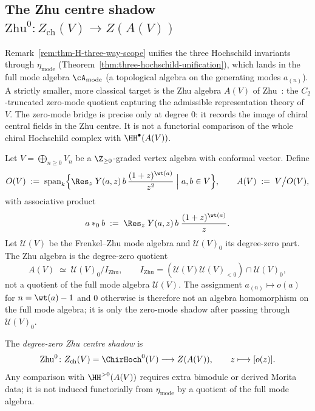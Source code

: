 \subsection{The Zhu centre shadow
\texorpdfstring{$\mathrm{Zhu}^0\colon Z_{\mathrm{ch}}(V)\to Z(A(V))$}{Zhu centre shadow}}
\label{subsec:zhu-bridge}

Remark~\ref{rem:thm-H-three-way-scope} unifies the three Hochschild
invariants through $\eta_{\mathrm{mode}}$ (Theorem~\ref{thm:three-hochschild-unification}),
which lands in the full mode algebra $\cA_{\mathrm{mode}}$
(a topological algebra on the generating modes $a_{(n)}$). A
strictly smaller, more classical target is the Zhu algebra
$A(V)$ of Zhu~\cite{Zhu96}: the $C_2$-truncated zero-mode quotient
capturing the admissible representation theory of $V$. The zero-mode
bridge is precise only at degree \(0\): it records the image of chiral
central fields in the Zhu centre. It is not a functorial comparison of
the whole chiral Hochschild complex with \(\HH^\bullet(A(V))\).

\begin{definition}%
\label{def:zhu-bridge}%
%
%
Let $V=\bigoplus_{n\ge 0}V_n$ be a $\Z_{\ge 0}$-graded vertex algebra
with conformal vector. Define
\[
 O(V) \;:=\; \mathrm{span}_k\Bigl\{
 \Res_z\; Y(a,z)\,b\,\frac{(1+z)^{\wt(a)}}{z^{2}}
 \;\Big|\; a,b\in V\Bigr\},
 \qquad
 A(V) \;:=\; V\big/ O(V),
\]
with associative product
\[
 a *_0 b \;:=\; \Res_z\; Y(a,z)\,b\;\frac{(1+z)^{\wt(a)}}{z}.
\]
Let \(\mathcal U(V)\) be the Frenkel--Zhu mode algebra and
\(\mathcal U(V)_0\) its degree-zero part.  The Zhu algebra is the
degree-zero quotient
\[
A(V)\;\simeq\;\mathcal U(V)_0/I_{\mathrm{Zhu}},
\qquad
I_{\mathrm{Zhu}}=(\mathcal U(V)\mathcal U(V)_{<0})\cap
\mathcal U(V)_0,
\]
not a quotient of the full mode algebra \(\mathcal U(V)\).  The
assignment \(a_{(n)}\mapsto o(a)\) for \(n=\wt(a)-1\) and \(0\)
otherwise is therefore not an algebra homomorphism on the full mode
algebra; it is only the zero-mode shadow after passing through
\(\mathcal U(V)_0\).

The \emph{degree-zero Zhu centre shadow} is
\[
\mathrm{Zhu}^0\colon
Z_{\mathrm{ch}}(V)=\ChirHoch^0(V)
\longrightarrow Z(A(V)),
\qquad
z\longmapsto [o(z)].
\]
Any comparison with \(\HH^{>0}(A(V))\) requires extra bimodule or
derived Morita data; it is not induced functorially from
\(\eta_{\mathrm{mode}}\) by a quotient of the full mode algebra.
\end{definition}

